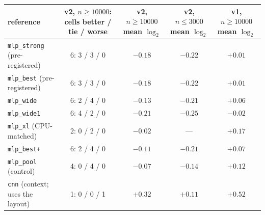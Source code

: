 \begin{tabular}{lcccc}
\toprule
reference & \hd{v2, $n\ge10000$: cells\\better / tie / worse} & \hd{v2, $n\ge10000$\\mean $\log_2$} & \hd{v2, $n\le3000$\\mean $\log_2$} & \hd{v1, $n\ge10000$\\mean $\log_2$}\\
\midrule
\texttt{mlp\_strong} (pre-registered) & 6: 3 / 3 / 0 & $-0.18$ & $-0.22$ & $+0.01$\\
\texttt{mlp\_best} (pre-registered) & 6: 3 / 3 / 0 & $-0.18$ & $-0.22$ & $+0.01$\\
\texttt{mlp\_wide} & 6: 2 / 4 / 0 & $-0.13$ & $-0.21$ & $+0.06$\\
\texttt{mlp\_wide1} & 6: 4 / 2 / 0 & $-0.21$ & $-0.25$ & $-0.02$\\
\texttt{mlp\_xl} (CPU-matched) & 2: 0 / 2 / 0 & $-0.02$ & --- & $+0.17$\\
\texttt{mlp\_best+} & 6: 2 / 4 / 0 & $-0.11$ & $-0.21$ & $+0.07$\\
\texttt{mlp\_pool} (control) & 4: 0 / 4 / 0 & $-0.07$ & $-0.14$ & $+0.12$\\
\texttt{cnn} (context; uses the layout) & 1: 0 / 0 / 1 & $+0.32$ & $+0.11$ & $+0.52$\\
\bottomrule
\end{tabular}
